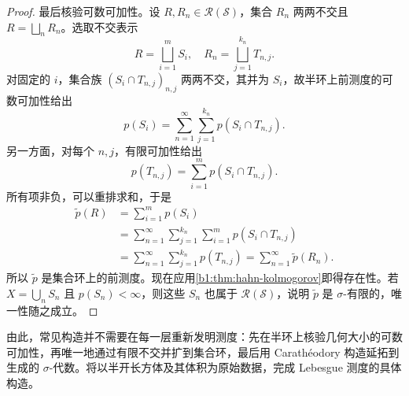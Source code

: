 \begin{proof}
最后核验可数可加性。设 \(R,R_n\in\mathcal R(\mathcal S)\)，集合 \(R_n\) 两两不交且 \(R=\bigsqcup_nR_n\)。选取不交表示
\[
R=\bigsqcup_{i=1}^{m}S_i,
\quad
R_n=\bigsqcup_{j=1}^{k_n}T_{n,j}.
\]
对固定的 \(i\)，集合族 \((S_i\cap T_{n,j})_{n,j}\) 两两不交，其并为 \(S_i\)，故半环上前测度的可数可加性给出
\[
p(S_i)=\sum_{n=1}^{\infty}\sum_{j=1}^{k_n}p(S_i\cap T_{n,j}).
\]
另一方面，对每个 \(n,j\)，有限可加性给出
\[
p(T_{n,j})=\sum_{i=1}^{m}p(S_i\cap T_{n,j}).
\]
所有项非负，可以重排求和，于是
\begin{align*}
\widetilde p(R)
&=\sum_{i=1}^{m}p(S_i)\\
&=\sum_{n=1}^{\infty}\sum_{j=1}^{k_n}\sum_{i=1}^{m}p(S_i\cap T_{n,j})\\
&=\sum_{n=1}^{\infty}\sum_{j=1}^{k_n}p(T_{n,j})
=\sum_{n=1}^{\infty}\widetilde p(R_n).
\end{align*}
所以 \(\widetilde p\) 是集合环上的前测度。现在应用\cref{b1:thm:hahn-kolmogorov}即得存在性。若 \(X=\bigcup_nS_n\) 且 \(p(S_n)<\infty\)，则这些 \(S_n\) 也属于 \(\mathcal R(\mathcal S)\)，说明 \(\widetilde p\) 是 \(\sigma\)-有限的，唯一性随之成立。
\end{proof}

由此，常见构造并不需要在每一层重新发明测度：先在半环上核验几何大小的可数可加性，再唯一地通过有限不交并扩到集合环，最后用 Carathéodory 构造延拓到生成的 \(\sigma\)-代数。将以半开长方体及其体积为原始数据，完成 Lebesgue 测度的具体构造。
